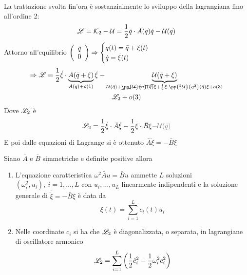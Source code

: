 \documentclass[Main.tex]{subfiles}
\begin{document}
\begin{osservazioni}
		\item La trattazione svolta fin'ora è sostanzialmente lo sviluppo della lagrangiana fino all'ordine 2:
		\begin{gather}
			\L = \K_2 - \U = \frac{1}{2} \dot q \cdot A(\bar q) \dot q - \U(q)
		\end{gather}
		Attorno all'equilibrio $\vec{ \bar q \\ 0 }\Rightarrow \begin{cases}
 				q(t) = \bar q + \xi (t) \\
 		 		\dot q = \dot \xi (t)	
 			\end{cases}$
		\begin{gather}
			\Rightarrow \L = \frac{1}{2} \dot \xi \cdot \underbrace{A(\bar q + \xi ) }_{A ( \bar q) +o(1)} \dot \xi - \underbrace{\U (\bar q + \xi)}_{\U(\bar q) + \cancel{\pp{\U}{q} (\bar q)} \xi + \frac{1}{2} \xi \cdot \pp{^2\U}{q^2} (\bar q) \xi + o(3)}\\
			\L_2 + o(3)
		\end{gather}
		Dove $\L_2$ è 
		\begin{equation}
			\L_2 = \frac{1}{2} \dot \xi \cdot \bar A \dot \xi - \frac{1}{2} \xi \cdot \bar B \xi \textcolor{gray}{ - \U(\bar q)}
		\end{equation}
		E poi dalle equazioni di Lagrange si è ottenuto $\bar A \ddot \xi = - \bar B \xi $
	\end{osservazioni}

\newpage
\begin{teo}[di Lagrange] Siano $\bar A$ e $\bar B$ simmetriche e definite positive allora
\begin{enumerate}
	\item L'equazione caratteristica $\omega^2 \bar A u = \bar B u$ ammette $L$ soluzioni $(\omega_i^2, u_i), \ i=1, \dots ,L$ con $u_i, \dots , u_L$ linearmente indipendenti e la soluzione generale di $\bar \ddot \xi = - \bar B \xi $ è data da 
	\begin{equation}
		\xi(t) = \sum_{i=1}^L c_i(t) u_i
	\end{equation} 
	
	\item Nelle coordinate $c_i$ si ha che $\L_2$ è diagonalizzata, o separata, in lagrangiane di oscillatore armonico
	\begin{equation}
		\L_2 = \sum_{i=1}^L \left( \frac{1}{2} \dot c^2_i - \frac{1}{2} \omega_i^2 c_i^2 \right)
	\end{equation} 
\end{enumerate}
\end{teo}
\end{document}
